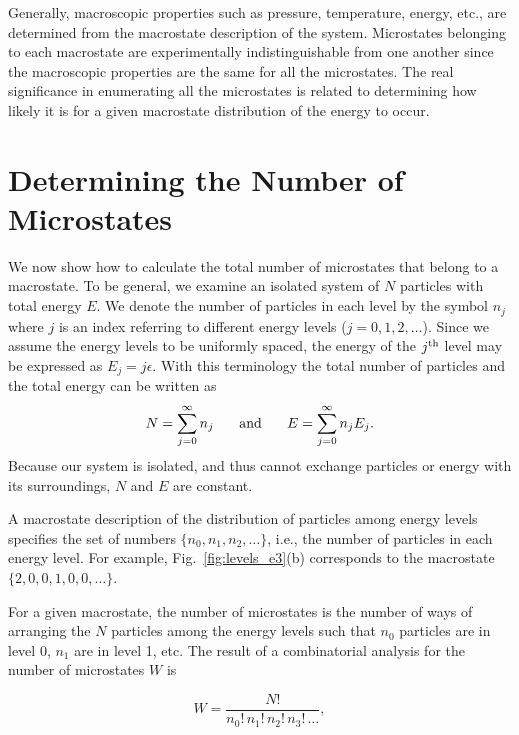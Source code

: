 Generally, macroscopic properties such as pressure, temperature,
energy, etc., are determined from the macrostate description of the
system.  Microstates belonging to each macrostate are experimentally
indistinguishable from one another since the macroscopic properties
are the same for all the microstates.  The real significance in
enumerating all the microstates is related to determining how likely
it is for a given macrostate distribution of the energy to occur.
       

\section{Determining the Number of Microstates}
  
We now show how to calculate the total number of microstates that
belong to a macrostate.  To be general, we examine an isolated system
of $N$ particles with total energy $E$.  We denote the number of particles
in each level by the symbol $n_j$ where $j$ is an index referring to
different energy levels ($j = 0, 1, 2,\dots$).  Since we assume the energy
levels to be uniformly spaced, the energy of the $j^{\rm th}$ level may be
expressed as $E_j = j\epsilon$.  With this terminology the total number of
particles and the total energy can be written as
\begin{equation}
N = \sum_{j=0}^\infty n_j\text{\hspace{0.25in}and\hspace{0.25in}}
E = \sum_{j=0}^\infty n_jE_j.
\end{equation}
Because our system is isolated, and thus cannot exchange particles or
energy with its surroundings, $N$ and $E$ are constant.

A macrostate description of the distribution of particles among energy
levels specifies the set of numbers $\{n_0, n_1, n_2,\dots\}$, i.e.,
the number of particles in each energy level.  For example,
Fig.~\ref{fig:levels_e3}(b) corresponds to the macrostate $\{2, 0, 0, 1,
0, 0, \dots\}$.

For a given macrostate, the number of microstates is the number of
ways of arranging the $N$ particles among the energy levels such that $n_0$
particles are in level 0, $n_1$ are in level 1, etc.  The result of a
combinatorial analysis for the number of microstates $W$ is

\begin{boxiteq}
{
\begin{equation}
W = \frac{N!}{n_0!\,n_1!\,n_2!\,n_3!\,\dots},
\label{eq:w}
\end{equation}
}
\end{boxiteq}
\vspace{-.3in}

